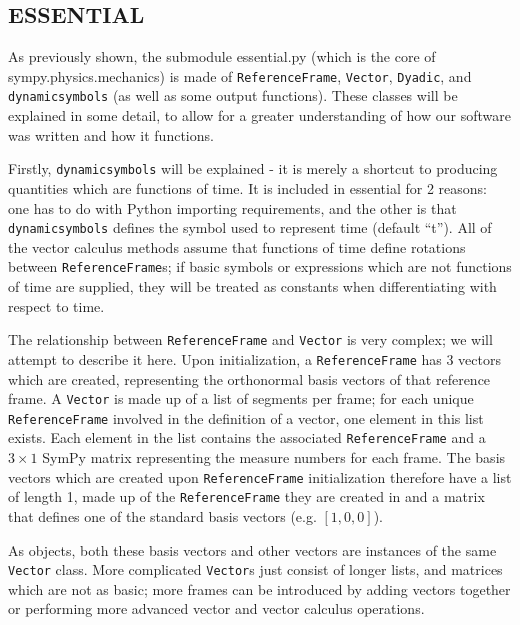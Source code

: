\documentclass[twocolumn,10pt]{asme2e}
\begin{document}
\subsection*{ESSENTIAL}
As previously shown, the submodule essential.py (which is the core of
sympy.physics.mechanics) is made of \verb|ReferenceFrame|, \verb|Vector|,
\verb|Dyadic|, and \verb|dynamicsymbols| (as well as some output functions).
These classes will be explained in some detail, to allow for a greater
understanding of how our software was written and how it functions.

Firstly, \verb|dynamicsymbols| will be explained - it is merely a shortcut to
producing quantities which are functions of time.
It is included in essential for 2 reasons: one has to do with Python importing
requirements, and the other is that \verb|dynamicsymbols| defines the symbol
used to represent time (default ``t'').
All of the vector calculus methods assume that functions of time define
rotations between \verb|ReferenceFrame|s; if basic symbols or expressions which
are not functions of time are supplied, they will be treated as constants when
differentiating with respect to time.

The relationship between \verb|ReferenceFrame| and \verb|Vector| is very
complex; we will attempt to describe it here.
Upon initialization, a \verb|ReferenceFrame| has 3 vectors which are created,
representing the orthonormal basis vectors of that reference frame.
A \verb|Vector| is made up of a list of segments per frame; for each unique
\verb|ReferenceFrame| involved in the definition of a vector, one element in
this list exists.
Each element in the list contains the associated \verb|ReferenceFrame| and a
$3\times1$ SymPy matrix representing the measure numbers for each frame.
The basis vectors which are created upon \verb|ReferenceFrame| initialization
therefore have a list of length 1, made up of the \verb|ReferenceFrame| they
are created in and a matrix that defines one of the standard basis vectors
(e.g. $[1, 0, 0]$).

As objects, both these basis vectors and other vectors are instances of the
same \verb|Vector| class.
More complicated \verb|Vector|s just consist of longer lists, and matrices
which are not as basic; more frames can be introduced by adding vectors
together or performing more advanced vector and vector calculus operations.
\end{document}
